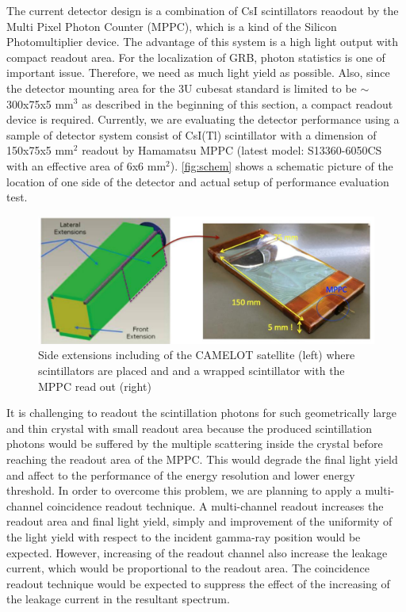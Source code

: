 \documentclass[12pt, a4paper,titlepage]{article}
\numberwithin{equation}{section}
\numberwithin{figure}{section}
\begin{document}
The current detector design is a combination of CsI scintillators reaodout by the Multi Pixel Photon Counter (MPPC), which is a kind of the Silicon Photomultiplier device. The advantage of this system is a high light output with compact readout area. For the localization of GRB, photon statistics is one of important issue. Therefore, we need as much light yield as possible. Also, since the detector mounting area for the 3U cubesat standard is limited to be $\sim$300x75x5 mm$^{3}$ as described in the beginning of this section, a compact readout device is required. Currently, we are evaluating the detector performance using a sample of detector system consist of CsI(Tl) scintillator with a dimension of 150x75x5 mm$^{2}$ readout by Hamamatsu MPPC (latest model: S13360-6050CS with an effective area of 6x6 mm$^{2}$). \ref{fig:schem} shows a schematic picture of the location of one side of the detector and actual setup of performance evaluation test.

\begin{figure}[H]
\centering
\includegraphics[width=130.0mm]{images/scint_on_sate.png}
\caption{Side extensions including of the CAMELOT satellite (left) where scintillators are placed and and a wrapped scintillator with the MPPC read out (right)}
\end{figure}

It is challenging to readout the scintillation photons for such geometrically large and thin crystal with small readout area because the produced scintillation photons would be suffered by the multiple scattering inside the crystal before reaching the readout area of the MPPC. This would degrade the final light yield and affect to the performance of the energy resolution and lower energy threshold. In order to overcome this problem, we are planning to apply a multi-channel coincidence readout technique. A multi-channel readout increases the readout area and final light yield, simply and improvement of the uniformity of the light yield with respect to the incident gamma-ray position would be expected. However, increasing of the readout channel also increase the leakage current, which would be proportional to the readout area. The coincidence readout technique would be expected to suppress the effect of the increasing of the leakage current in the resultant spectrum. 
\end{document}
